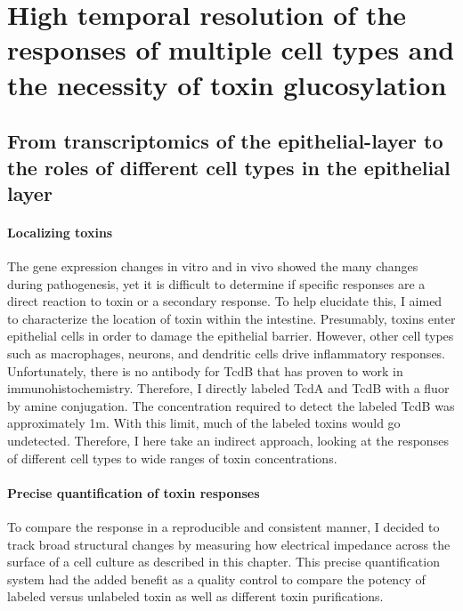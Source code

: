 \doublespacing

\chapter[Responses of multiple cell types]{ High temporal resolution 
           of the responses of multiple cell 
           types and the necessity of toxin glucosylation }\label{chapter:imp}


\section{From transcriptomics of the epithelial-layer to the roles
           of different cell types in the epithelial layer}

\subsubsection{Localizing toxins}
The gene expression changes in vitro and in vivo showed
the many changes during pathogenesis, yet it is difficult
to determine if specific responses are a direct
reaction to toxin or a secondary response.
To help elucidate this, I aimed to characterize the location
of toxin within the intestine.
Presumably, toxins enter
epithelial cells in order to damage the epithelial barrier.
However, other cell types such as macrophages, neurons, and dendritic cells
drive inflammatory responses. Unfortunately, there is no
antibody for TcdB that has proven to work in immunohistochemistry.
Therefore, I directly labeled TcdA and TcdB with a fluor by amine conjugation.
The concentration required to detect the labeled TcdB
was approximately 1\textmugreek{}m. With this limit, much
of the labeled toxins would go undetected. Therefore, I here take
an indirect approach, looking at the responses of different cell
types to wide ranges of toxin concentrations.

\subsubsection{Precise quantification of toxin responses}
To compare the response in a reproducible and consistent manner,
I decided to track broad structural changes by measuring how electrical
impedance across the surface of a cell culture as described in this chapter.
This precise quantification system had the added benefit as a
quality control to compare the potency of labeled versus unlabeled toxin
as well as different toxin purifications.

